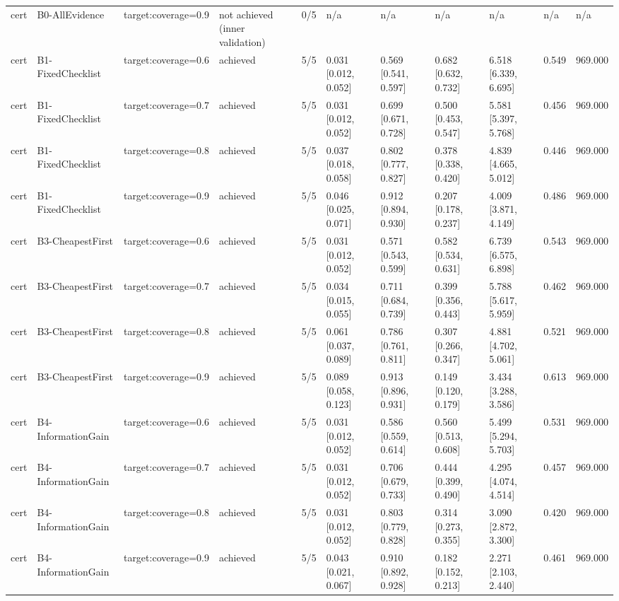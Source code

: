 \begin{table}[!ht]
{\begin{tabular}{lllllllllll}
cert & B0-AllEvidence & target:coverage=0.9 & not achieved (inner validation) & 0/5 & n/a & n/a & n/a & n/a & n/a & n/a \\
cert & B1-FixedChecklist & target:coverage=0.6 & achieved & 5/5 & 0.031 [0.012, 0.052] & 0.569 [0.541, 0.597] & 0.682 [0.632, 0.732] & 6.518 [6.339, 6.695] & 0.549 & 969.000 \\
cert & B1-FixedChecklist & target:coverage=0.7 & achieved & 5/5 & 0.031 [0.012, 0.052] & 0.699 [0.671, 0.728] & 0.500 [0.453, 0.547] & 5.581 [5.397, 5.768] & 0.456 & 969.000 \\
cert & B1-FixedChecklist & target:coverage=0.8 & achieved & 5/5 & 0.037 [0.018, 0.058] & 0.802 [0.777, 0.827] & 0.378 [0.338, 0.420] & 4.839 [4.665, 5.012] & 0.446 & 969.000 \\
cert & B1-FixedChecklist & target:coverage=0.9 & achieved & 5/5 & 0.046 [0.025, 0.071] & 0.912 [0.894, 0.930] & 0.207 [0.178, 0.237] & 4.009 [3.871, 4.149] & 0.486 & 969.000 \\
cert & B3-CheapestFirst & target:coverage=0.6 & achieved & 5/5 & 0.031 [0.012, 0.052] & 0.571 [0.543, 0.599] & 0.582 [0.534, 0.631] & 6.739 [6.575, 6.898] & 0.543 & 969.000 \\
cert & B3-CheapestFirst & target:coverage=0.7 & achieved & 5/5 & 0.034 [0.015, 0.055] & 0.711 [0.684, 0.739] & 0.399 [0.356, 0.443] & 5.788 [5.617, 5.959] & 0.462 & 969.000 \\
cert & B3-CheapestFirst & target:coverage=0.8 & achieved & 5/5 & 0.061 [0.037, 0.089] & 0.786 [0.761, 0.811] & 0.307 [0.266, 0.347] & 4.881 [4.702, 5.061] & 0.521 & 969.000 \\
cert & B3-CheapestFirst & target:coverage=0.9 & achieved & 5/5 & 0.089 [0.058, 0.123] & 0.913 [0.896, 0.931] & 0.149 [0.120, 0.179] & 3.434 [3.288, 3.586] & 0.613 & 969.000 \\
cert & B4-InformationGain & target:coverage=0.6 & achieved & 5/5 & 0.031 [0.012, 0.052] & 0.586 [0.559, 0.614] & 0.560 [0.513, 0.608] & 5.499 [5.294, 5.703] & 0.531 & 969.000 \\
cert & B4-InformationGain & target:coverage=0.7 & achieved & 5/5 & 0.031 [0.012, 0.052] & 0.706 [0.679, 0.733] & 0.444 [0.399, 0.490] & 4.295 [4.074, 4.514] & 0.457 & 969.000 \\
cert & B4-InformationGain & target:coverage=0.8 & achieved & 5/5 & 0.031 [0.012, 0.052] & 0.803 [0.779, 0.828] & 0.314 [0.273, 0.355] & 3.090 [2.872, 3.300] & 0.420 & 969.000 \\
cert & B4-InformationGain & target:coverage=0.9 & achieved & 5/5 & 0.043 [0.021, 0.067] & 0.910 [0.892, 0.928] & 0.182 [0.152, 0.213] & 2.271 [2.103, 2.440] & 0.461 & 969.000 \\

\end{tabular}}
\end{table}
